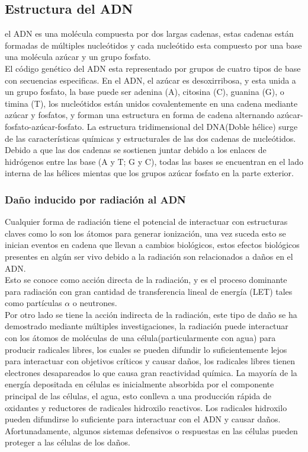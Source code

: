 \subsection{Estructura del ADN}
el ADN es una molécula compuesta por dos largas cadenas, estas cadenas están formadas de múltiples
nucleótidos y cada
nucleótido esta compuesto por una base una molécula azúcar y un grupo fosfato.\\
El código genético del ADN esta representado por grupos de cuatro tipos de base con secuencias especificas. En el ADN, el azúcar es desoxirribosa, y esta unida a un grupo fosfato,  la base puede ser adenina (A), citosina (C), guanina (G), o timina (T), los nucleótidos están unidos covalentemente en una cadena mediante azúcar y fosfatos, y forman una estructura en forma de cadena alternando azúcar-fosfato-azúcar-fosfato. La estructura tridimensional del DNA(Doble hélice) surge de las características químicas y estructurales de las dos cadenas de
nucleótidos. Debido a que las dos cadenas se sostienen juntar debido a los enlaces de hidrógenos entre las base (A y T; G y C), todas las bases se encuentran en el lado interna de las hélices mientas que los grupos azúcar fosfato en la parte exterior\cite{rescells}.

\subsubsection{Daño inducido por radiación al ADN}

 Cualquier forma de radiación tiene el potencial de interactuar con estructuras claves como lo son los átomos para generar ionización, una vez suceda esto se inician eventos en cadena que llevan a cambios biológicos, estos efectos biológicos presentes en algún ser vivo debido a la radiación son relacionados a daños en el ADN.\\
 Esto se conoce como  acción directa de la radiación, y es el proceso dominante para radiación con gran cantidad de transferencia lineal de energía (LET) tales como partículas $\alpha$ o neutrones\cite{rescells}.\\

Por otro lado se tiene la acción indirecta de la radiación, este tipo de daño se ha demostrado mediante múltiples investigaciones\cite{willmari}, la radiación puede interactuar con los átomos de moléculas de una célula(particularmente con agua) para producir radicales libres, los cuales se pueden difundir lo suficientemente lejos para interactuar con objetivos críticos y causar daños, los radicales libres tienen electrones desapareados lo que causa gran reactividad química. La mayoría de la energía  depositada en células es inicialmente absorbida por el componente principal de las células, el agua, esto conlleva a una producción rápida de oxidantes y reductores de radicales hidroxilo reactivos. Los radicales hidroxilo pueden difundirse lo suficiente para interactuar con el ADN y causar daños. Afortunadamente, algunos sistemas defensivos o respuestas en las células pueden proteger a las células de los daños\cite{rescells}.\\

